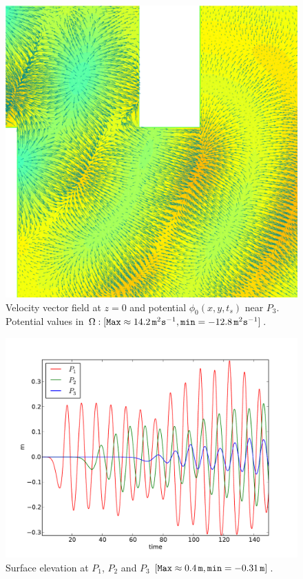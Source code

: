 \begin{figure}[!htb]
{\centering
\includegraphics[width=\largefig]{chapters/lopes/pdf/pvel2.pdf}
\caption{Velocity vector field at $z=0$ and potential
$\phi_0(x,y,t_s)$ near $P_3$.
Potential values in $\Omega : [{\tt Max}\approx 14.2\,{\tt m}^{2}{\tt s}^{-1}, {\tt min}=-12.8\, {\tt m}^{2}{\tt s}^{-1}]$.}
\label{lopes:fig:potential1}\par}
\end{figure}
\begin{figure}[!htb]
{\centering
\includegraphics[width=\largefig]{chapters/lopes/pdf/etaprofile.pdf}
\caption{Surface elevation at $P_1$, $P_2$ and $P_3$ $[{\tt Max}\approx 0.4\, {\tt m}, {\tt min}=-0.31\,{\tt m}]$.}\label{lopes:fig:etap}\par}
\end{figure}
